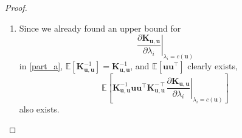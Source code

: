 \documentclass{article}
\theoremstyle{definition}
\newcommand{\Kuu}{\mathbf{K}_{\mathbf{u},\mathbf{u}}}
\begin{document}
\begin{proof}
\begin{enumerate}
\begin{enumerate}
      If $i > 0$, then each element of $\frac{\partial \Kuu}{\partial
        \lambda_i}$ is a constant multiple of $k_{\bm\lambda}(\mathbf{x}_j,
      \mathbf{x}_k)$ for some $\mathbf{x}_j$ and $\mathbf{x}_k$. Since
      $k_{\bm\lambda}(\mathbf{x}_j, \mathbf{x}_k)$ is a decreasing function of
      $\lambda_i$, and $c(\mathbf{u}) > \lambda_i - \epsilon$,
      \[
        \begin{split}
          k_{\bm\lambda}(\mathbf{x}_j, \mathbf{x}_k)|_{\lambda_i = 
            c(\mathbf{u})} &=
          \begin{multlined}[t]
            \lambda_0 \exp \left( \vphantom{\sum_{l \in \{ \} \setminus}}
            \right. -\frac{1}{2}c(\mathbf{u})(x_{j,i} - x_{k,i})^2 -
            \mathbbm{1}[j \ne k]\sigma^2c(\mathbf{u}) \\
            - \left. \sum_{l \in \{ 1, \dots, d \} \setminus \{ i \}} \frac{1}{2}
              \lambda_l(x_{j,l} - x_{k,l})^2 + \mathbbm{1}[j \ne k]\sigma^2
              \lambda_l \right)
          \end{multlined} \\
          &<
          \begin{multlined}[t]
            \lambda_0 \exp \left( \vphantom{\sum_{l \in \{ \} \setminus}}
            \right. -\frac{1}{2}(\lambda_i - \epsilon)(x_{j,i} - x_{k,i})^2 -
            \mathbbm{1}[j \ne k]\sigma^2(\lambda_i - \epsilon) \\
            - \left. \sum_{l \in \{ 1, \dots, d \} \setminus \{ i \}} \frac{1}{2}
              \lambda_l(x_{j,l} - x_{k,l})^2 + \mathbbm{1}[j \ne k]\sigma^2
              \lambda_l \right),
          \end{multlined}
        \end{split}
      \]
      which gives an upper bound on each element of
      \[
        \left. \frac{\partial \Kuu}{\partial \lambda_i} \right|_{\lambda_i =
          c(\mathbf{u})}.
      \]
      and shows the existence of
      \[
        \mathbb{E} \left[ \left. \frac{\partial \Kuu}{\partial \lambda_i}
          \right|_{\lambda_i = c(\mathbf{u})} \right].
      \]
    \item Since we already found an upper bound for
      \[
        \left. \frac{\partial \Kuu}{\partial \lambda_i} \right|_{\lambda_i =
          c(\mathbf{u})}
      \]
      in \ref{part_a}, $\mathbb{E}[\Kuu^{-1}] = \Kuu^{-1}$, and
      $\mathbb{E}[\mathbf{u}\mathbf{u}^\intercal]$ clearly exists,
      \[
        \mathbb{E} \left[
          \Kuu^{-1}\mathbf{u}\mathbf{u}^\intercal\Kuu^{-\intercal} \left.
            \frac{\partial \Kuu}{\partial \lambda_i} \right|_{\lambda_i =
            c(\mathbf{u})} \right]
      \]
      also exists.
    \end{enumerate}
  \end{enumerate}
\end{proof}
\end{document}

